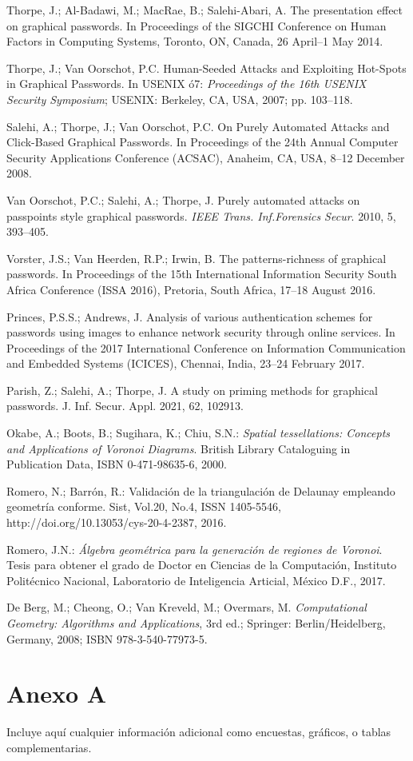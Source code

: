 \documentclass[12pt]{report}
\begin{document}
\begin{thebibliography}{9}
{		Thorpe, J.; Al-Badawi, M.; MacRae, B.; Salehi-Abari, A. The presentation effect on graphical passwords. In Proceedings of the SIGCHI Conference on Human Factors in Computing Systems, Toronto, ON, Canada, 26 April–1 May 2014.
		
		Thorpe, J.; Van Oorschot, P.C. Human-Seeded Attacks and Exploiting Hot-Spots in Graphical Passwords. In USENIX ó7: \textit{Proceedings of the 16th USENIX Security Symposium}; USENIX: Berkeley, CA, USA, 2007; pp. 103–118.
		
		Salehi, A.; Thorpe, J.; Van Oorschot, P.C. On Purely Automated Attacks and Click-Based Graphical Passwords. In Proceedings of the 24th Annual Computer Security Applications Conference (ACSAC), Anaheim, CA, USA, 8–12 December 2008.
		
		Van Oorschot, P.C.; Salehi, A.; Thorpe, J. Purely automated attacks on passpoints style graphical passwords.\textit{ IEEE Trans. Inf.Forensics Secur}. 2010, 5, 393–405.
		
		Vorster, J.S.; Van Heerden, R.P.; Irwin, B. The patterns-richness of graphical passwords. In Proceedings of the 15th International Information Security South Africa Conference (ISSA 2016), Pretoria, South Africa, 17–18 August 2016.
		
		Princes, P.S.S.; Andrews, J. Analysis of various authentication schemes for passwords using images to enhance network security through online services. In Proceedings of the 2017 International Conference on Information Communication and Embedded Systems (ICICES), Chennai, India, 23–24 February 2017.
		
		Parish, Z.; Salehi, A.; Thorpe, J. A study on priming methods for graphical passwords. J. Inf. Secur. Appl. 2021, 62, 102913.
		
		Okabe, A.; Boots, B.; Sugihara, K.; Chiu, S.N.: \textit{Spatial tessellations: Concepts and Applications of Voronoi Diagrams}. British Library Cataloguing in Publication Data, ISBN 0-471-98635-6, 2000.
		
		Romero, N.; Barrón, R.: Validación de la triangulación de Delaunay empleando geometría conforme. Sist, Vol.20, No.4, ISSN 1405-5546, http://doi.org/10.13053/cys-20-4-2387, 2016.
		
		Romero, J.N.:  \textit{Álgebra geométrica para la generación de regiones de Voronoi}. Tesis para obtener el grado de Doctor en Ciencias de la Computación, Instituto Politécnico Nacional, Laboratorio de Inteligencia Articial, México D.F., 2017.
		
		De Berg, M.; Cheong, O.; Van Kreveld, M.; Overmars, M. \textit{Computational Geometry: Algorithms and Applications}, 3rd ed.; Springer: Berlin/Heidelberg, Germany, 2008; ISBN 978-3-540-77973-5.
	
}
\end{thebibliography}


\appendix
\chapter{Anexo A}
Incluye aquí cualquier información adicional como encuestas, gráficos, o tablas complementarias.
\end{document}
